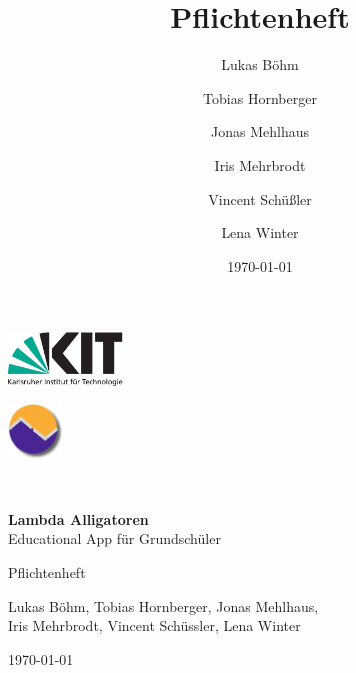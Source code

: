 \documentclass{scrartcl}
\begin{document}
\begin{titlepage}
\begin{center}
\begin{minipage}{0.4\textwidth}
	\begin{flushleft} \large
		\includegraphics[height=40pt]{kitlogo.pdf}
	\end{flushleft}
\end{minipage}
\begin{minipage}{0.4\textwidth}
	\begin{flushright} \large
		\includegraphics[height=40pt]{stlogo-600dpi.pdf}
	\end{flushright}
\end{minipage} \\[2cm]
\end{center}
\begin{center}
	{\huge \bfseries Lambda Alligatoren}\\[0.1cm] 
	{\large Educational App für Grundschüler}
\end{center}


\begin{center}
	{\Large Pflichtenheft}\\[0.5cm]
\end{center}
\begin{center}
	{Lukas Böhm, Tobias Hornberger, Jonas Mehlhaus, \\ Iris Mehrbrodt, Vincent Schüssler, Lena Winter} \\[1cm]
\end{center}

\begin{center}
	{\large \today}
\end{center}
	
	
	\begin{center}
	\end{center}
	\vfill


\end{titlepage}

\iffalse
\title{Pflichtenheft}
\author{ 
	Lukas Böhm\and 
	Tobias Hornberger\and 
	Jonas Mehlhaus\and 
	Iris Mehrbrodt\and 
	Vincent Schüßler \and 
	Lena Winter
}
\date{\today}
\end{document}
